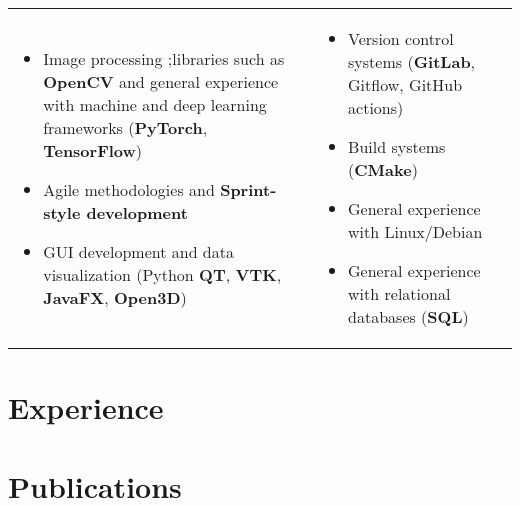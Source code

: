 \documentclass[letterpaper]{twentysecondcv} %
\begin{document}
\begin{tabularx}{\linewidth}{XX}
	\begin{itemize}
		\item Image processing ;libraries such as \textbf{OpenCV} and general experience with machine and deep learning frameworks (\textbf{PyTorch}, \textbf{TensorFlow})
		\item Agile methodologies and \textbf{Sprint-style development}
		\item GUI development and data visualization (Python \textbf{QT}, \textbf{VTK}, \textbf{JavaFX}, \textbf{Open3D})
	\end{itemize} & 
	\begin{itemize}
		\item Version control systems (\textbf{GitLab}, Gitflow, GitHub actions)
		\item Build systems (\textbf{CMake})
		\item General experience with Linux/Debian
		\item General experience with relational databases (\textbf{SQL})
	\end{itemize} \\
\end{tabularx}





\section*{Experience}

\experience





\section*{Publications}

\publications





\end{document}
